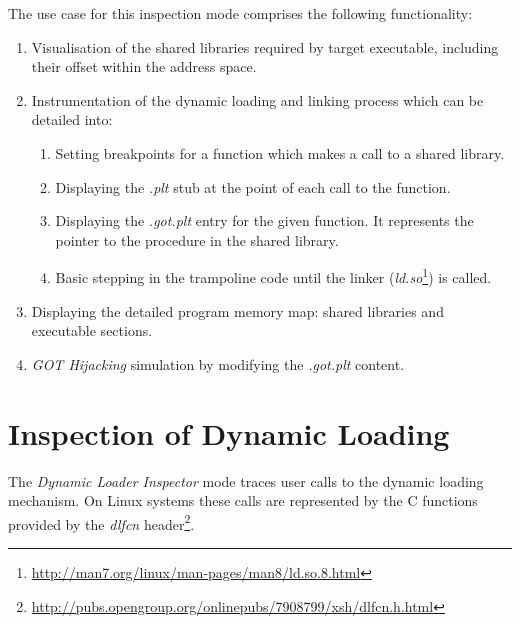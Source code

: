 The use case for this inspection mode comprises the following functionality:
\begin{enumerate}
\item Visualisation of the shared libraries required by target executable, including their offset within the address space.
\item Instrumentation of the dynamic loading and linking process which can be detailed into:
\begin{enumerate}
\item Setting breakpoints for a function which makes a call to a shared library.
\item Displaying the \textit{.plt} stub at the point of each call to the function. 
\item Displaying the \textit{.got.plt} entry for the given function. It represents the pointer to the procedure in the shared library.
\item Basic stepping in the trampoline code until the linker (\textit{ld.so}\footnote{\url{http://man7.org/linux/man-pages/man8/ld.so.8.html}}) is called.
\end{enumerate}
\item Displaying the detailed program memory map: shared libraries and executable sections.
\item \textit{GOT Hijacking} simulation by modifying the \textit{.got.plt} content.
\end{enumerate}

\section{Inspection of Dynamic Loading}
\label{sec:dyn-load-inspector-mode}

The \textit{Dynamic Loader Inspector} mode traces user calls to the dynamic loading mechanism. On Linux systems these calls are represented by the C functions provided by the \textit{dlfcn} header\footnote{\url{http://pubs.opengroup.org/onlinepubs/7908799/xsh/dlfcn.h.html}}.

